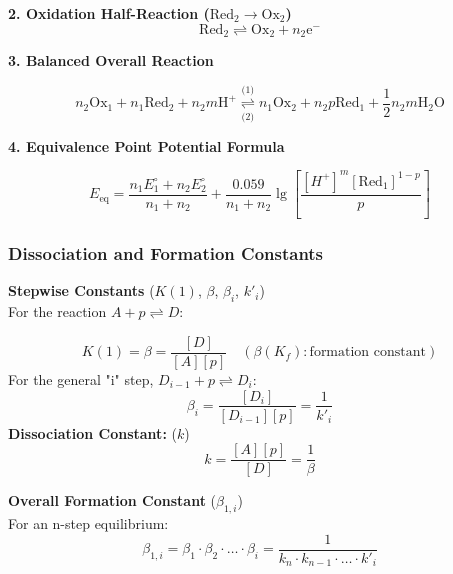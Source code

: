 \textbf{2. Oxidation Half-Reaction ($\text{Red}_{2} \rightarrow \text{Ox}_{2}$)}
\begin{equation}
\text{Red}_{2} \rightleftharpoons \text{Ox}_{2} + n_{2}\text{e}^{-}
\end{equation}

\textbf{3. Balanced Overall Reaction}


\begin{equation}
n_{2}\text{Ox}_{1} + n_{1}\text{Red}_{2} + n_{2}m\text{H}^{+} \mathrel{\mathop{\rightleftharpoons}\limits_{\text{(2)}}^{\text{(1)}}} n_{1}\text{Ox}_{2} + n_{2}p\text{Red}_{1} + \frac{1}{2}n_{2}m\text{H}_{2}\text{O}
\end{equation}

\textbf{4. Equivalence Point Potential Formula}

\begin{equation}
E_{\text{eq}} = \frac{n_1 E_1^\circ + n_2 E_2^\circ}{n_1 + n_2} + \frac{0.059}{n_1 + n_2} \lg \left[ \frac{[H^+]^m [\text{Red}_1]^{1-p}}{p} \right]
\end{equation}

\subsubsection*{Dissociation and Formation Constants}

\textbf{Stepwise Constants} ($K(1)$, $\beta$, $\beta_i$, $k'_i$)\\
For the reaction \( A + p \rightleftharpoons D \):

\begin{equation}
K(1) = \beta = \frac{[D]}{[A][p]} \quad (\beta (K_f): \text{formation constant})
\end{equation}
For the general "i" step, \( D_{i-1} + p \rightleftharpoons D_i \):
\begin{equation}
\beta_i = \frac{[D_i]}{[D_{i-1}][p]} = \frac{1}{k'_i}
\end{equation}
\textbf{Dissociation Constant:} ($k$)
\begin{equation}
k = \frac{[A][p]}{[D]} = \frac{1}{\beta}
\end{equation}

\vspace{5mm}

\textbf{Overall Formation Constant} ($\beta_{1,i}$)\\
For an n-step equilibrium:
\begin{equation}
\beta_{1,i} = \beta_1 \cdot \beta_2 \cdot \ldots \cdot \beta_i = \frac{1}{k_n \cdot k_{n-1} \cdot \ldots \cdot k'_i}
\end{equation}

